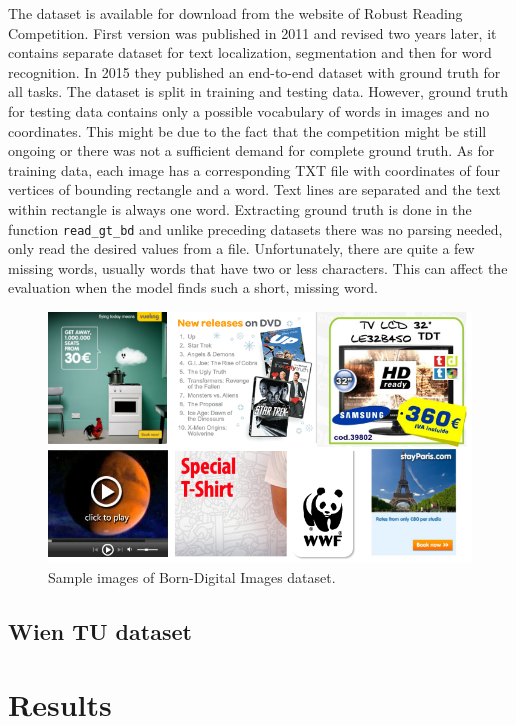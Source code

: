 The dataset is available for download from the website of Robust Reading Competition. First version was published in 2011 and revised two years later, it contains separate dataset for text localization, segmentation and then for word recognition. In 2015 they published an end-to-end dataset with ground truth for all tasks. The dataset is split in training and testing data. However, ground truth for testing data contains only a possible vocabulary of words in images and no coordinates. This might be due to the fact that the competition might be still ongoing or there was not a sufficient demand for complete ground truth. As for training data, each image has a corresponding TXT file with coordinates of four vertices of bounding rectangle and a word. Text lines are separated and the text within rectangle is always one word. Extracting ground truth is done in the function \texttt{read\_gt\_bd} and unlike preceding datasets there was no parsing needed, only read the desired values from a file. Unfortunately, there are quite a few missing words, usually words that have two or less characters. This can affect the evaluation when the model finds such a short, missing word.\cite{born-digital1}

\begin{figure}[hbtp]
    \centering
    \includegraphics[scale=0.4]{obrazky/Dataset_born-digital.png}
    \caption{Sample images of Born-Digital Images dataset.}
    \label{Im:Dbd}
\end{figure}


\subsection{Wien TU dataset}

\section{Results}

